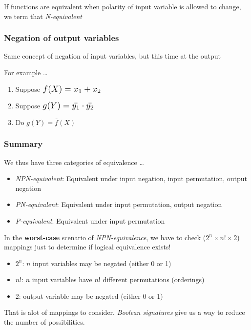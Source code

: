 \documentclass{article}
\newcommand*{\Scale}[2][4]{\scalebox{#1}{\ensuremath{#2}}}%
\begin{document}
If functions are equivalent when polarity of input variable is allowed to change, we term that \textit{N-equivalent}

\subsubsection{Negation of output variables}
Same concept of negation of input variables, but this time at the output

For example \dots

\begin{enumerate}[label*=\arabic*.]
    \item Suppose $\Scale[1.25]{f(X) = x_{1} + x_{2}}$
    \item Suppose $\Scale[1.25]{g(Y) = \bar{y_{1}} \cdot \bar{y_{2}}}$
    \item Do $g(Y) = \bar{f}(X)$
\end{enumerate}

\subsubsection{Summary}
We thus have three categories of equivalence \dots
\begin{itemize}
    \item \textit{NPN-equivalent}: Equivalent under input negation, input permutation, output negation
    \item \textit{PN-equivalent}: Equivalent under input permutation, output negation
    \item \textit{P-equivalent}: Equivalent under input permutation
\end{itemize}

\vspace{0.5cm}
In the \textbf{worst-case} scenario of \textit{NPN-equivalence}, we have to check
($2^{n} \times n! \times 2$) mappings just to determine if logical equivalence exists!
\begin{itemize}
    \item $2^{n}$: $n$ input variables may be negated (either 0 or 1)
    \item $n!$: $n$ input variables have $n!$ different permutations (orderings)
    \item $2$: output variable may be negated (either 0 or 1)
\end{itemize}

That is alot of mappings to consider. \textit{Boolean signatures} give us a way to reduce the number of possibilities.
\end{document}
